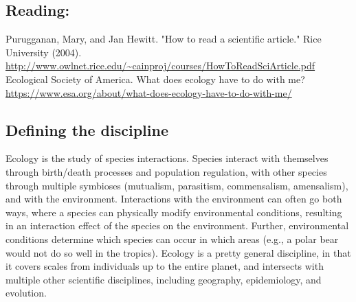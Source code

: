 \documentclass[12pt]{article}
\begin{document}
\subsection*{Reading:}

Purugganan, Mary, and Jan Hewitt. "How to read a scientific article." Rice University (2004). \url{http://www.owlnet.rice.edu/~cainproj/courses/HowToReadSciArticle.pdf} \\



Ecological Society of America. What does ecology have to do with me? \url{https://www.esa.org/about/what-does-ecology-have-to-do-with-me/}













\begin{center}
\noindent\hrulefill 
\end{center}



\clearpage





% 
% 









\subsection*{Defining the discipline}

Ecology is the study of species interactions. Species interact with themselves through birth/death processes and population regulation, with other species through multiple symbioses (mutualism, parasitism, commensalism, amensalism), and with the environment. Interactions with the environment can often go both ways, where a species can physically modify environmental conditions, resulting in an interaction effect of the species on the environment. Further, environmental conditions determine which species can occur in which areas (e.g., a polar bear would not do so well in the tropics). Ecology is a pretty general discipline, in that it covers scales from individuals up to the entire planet, and intersects with multiple other scientific disciplines, including geography, epidemiology, and evolution.
\end{document}
